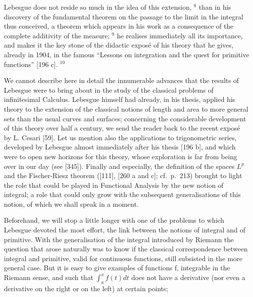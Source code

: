 Lebesgue does not reside so much in the idea of this extension, \(^{8}\) than in his discovery of the fundamental theorem on the passage to the limit in the integral thus conceived, a theorem which appears in his work as a consequence of the complete additivity of the measure; \(^{9}\) he realises immediately all its importance, and makes it the key stone of the didactic exposé of his theory that he gives, already in 1904, in the famous ``Lessons on integration and the quest for primitive functions'' {[}196 c{]}. \(^{10}\)

We cannot describe here in detail the innumerable advances that the results of Lebesgue were to bring about in the study of the classical problems of infinitesimal Calculus. Lebesgue himself had already, in his thesis, applied his theory to the extension of the classical notions of length and area to more general sets than the usual curves and surfaces; concerning the considerable development of this theory over half a century, we send the reader back to the recent exposé by L. Cesari {[}59{]}. Let us mention also the applications to trigonometric series, developed by Lebesgue almost immediately after his thesis {[}196 b{]}, and which were to open new horizons for this theory, whose exploration is far from being over in our day (see {[}345{]}). Finally and especially, the definition of the spaces \(L^p\) and the Fischer-Riesz theorem ({[}111{]}, {[}260 a and c{]}; cf.~p.~213) brought to light the role that could be played in Functional Analysis by the new notion of integral; a role that could only grow with the subsequent generalisations of this notion, of which we shall speak in a moment.

Beforehand, we will stop a little longer with one of the problems to which Lebesgue devoted the most effort, the link between the notions of integral and of primitive. With the generalisation of the integral introduced by Riemann the question that arose naturally was to know if the classical correspondence between integral and primitive, valid for continuous functions, still subsisted in the more general case. But it is easy to give examples of functions f, integrable in the Riemann sense, and such that \(\int_{a}^{x}f(t)dt\) does not have a derivative (nor even a derivative on the right or on the left) at certain points;

